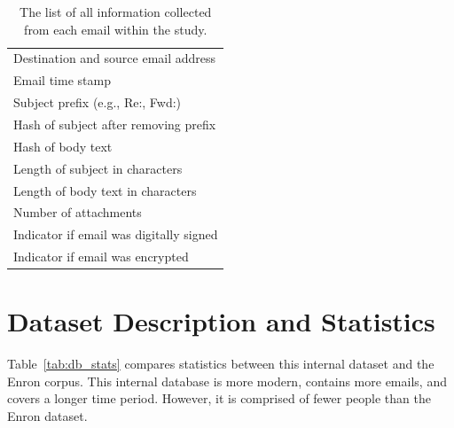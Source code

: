 \documentclass[12pt]{report}
\begin{document}
\begin{table}[t]
\centering
\caption{The list of all information collected from each email within the study.}
\label{tab:db_metadata}
\begin{tabular}{@{}l@{}}
\toprule
Destination and source email address    \\
Email time stamp                        \\
Subject prefix (e.g., Re:, Fwd:)        \\
Hash of subject after removing prefix   \\
Hash of body text                       \\
Length of subject in characters         \\
Length of body text in characters       \\
Number of attachments                   \\
Indicator if email was digitally signed \\
Indicator if email was encrypted        \\ \bottomrule
\end{tabular}
\end{table}


\section{Dataset Description and Statistics}
Table~\ref{tab:db_stats} compares statistics between this internal dataset and the Enron corpus.
This internal database is more modern, contains more emails, and covers a longer time period.
However, it is comprised of fewer people than the Enron dataset.

\begin{table}[t]
\centering
\caption{A comparison between the internal dataset and the Enron email corpus.}
\label{tab:db_stats}
\end{table}
\end{document}
